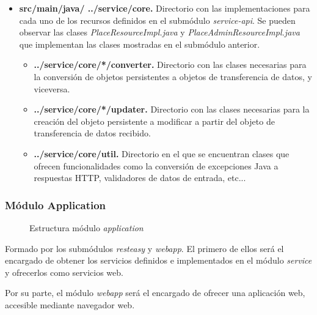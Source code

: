 \begin{itemize}
	\item \textbf{src/main/java/ ../service/core. } Directorio con las implementaciones para cada uno de los recursos definidos en el submódulo \textit{service-api}. Se pueden observar las clases \textit{PlaceResourceImpl.java} y \textit{PlaceAdminResourceImpl.java} que implementan las clases mostradas en el submódulo anterior.
	\begin{itemize}
		\item \textbf{../service/core/*/converter. } Directorio con las clases necesarias para la conversión de objetos persistentes a objetos de transferencia de datos, y viceversa.
		\item \textbf{../service/core/*/updater. } Directorio con las clases necesarias para la creación del objeto persistente a modificar a partir del objeto de transferencia de datos recibido. 
		\item \textbf{../service/core/util. } Directorio en el que se encuentran clases que ofrecen funcionalidades como la conversión de excepciones Java a respuestas HTTP, validadores de datos de entrada, etc...
	\end{itemize}
\end{itemize}



\subsubsection*{Módulo Application}
\begin{figure}[H]
\centering
{}
\caption{Estructura módulo \textit{application}}
\end{figure}

Formado por los submódulos \textit{resteasy} y \textit{webapp}. El primero de ellos será el encargado de obtener los servicios definidos e implementados en el módulo \textit{service} y ofrecerlos como servicios web. 

Por su parte, el módulo \textit{webapp} será el encargado de ofrecer una aplicación web, accesible mediante navegador web. 



